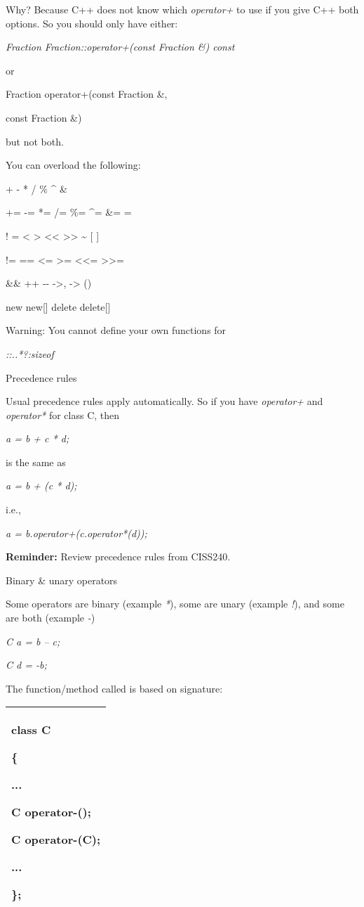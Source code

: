 \documentclass[
]{article}
\begin{document}
Why? Because C++ does not know which \emph{operator+} to use if you give
C++ both options. So you should only have either:

\emph{ Fraction Fraction::operator+(const Fraction \&) const}

or

Fraction operator+(const Fraction \&,

const Fraction \&)

but not both.

You can overload the following:

+ - * / \% \^{} \& \textbar{}

+= -= *= /= \%= \^{}= \&= \textbar=

! = \textless{} \textgreater{} \textless\textless{}
\textgreater\textgreater{} \textasciitilde{} {[} {]}

!= == \textless= \textgreater= \textless\textless=
\textgreater\textgreater=

\&\& \textbar\textbar{} ++ -\/- -\textgreater* , -\textgreater{} ()

new new{[}{]} delete delete{[}{]}

Warning: You cannot define your own functions for

\emph{::..*?:sizeof}

Precedence rules

Usual precedence rules apply automatically. So if you have
\emph{operator+} and \emph{operator*} for class C, then

\emph{a = b + c * d;}

is the same as

\emph{a = b + (c * d);}

i.e.,

\emph{a = b.operator+(c.operator*(d));}

\textbf{Reminder:} Review precedence rules from CISS240.

Binary \& unary operators

Some operators are binary (example \emph{*}), some are unary (example
\emph{!}), and some are both (example \emph{-})

\emph{C a = b -- c;}

\emph{C d = -b;}

The function/method called is based on signature:

\begin{longtable}[]{@{}l@{}}
\toprule
\endhead
\begin{minipage}[t]{0.97\columnwidth}\raggedright
class C

\{

...

C operator-();

C operator-(C);

...

\};\strut
\end{minipage}\tabularnewline
\bottomrule
\end{longtable}
\end{document}
